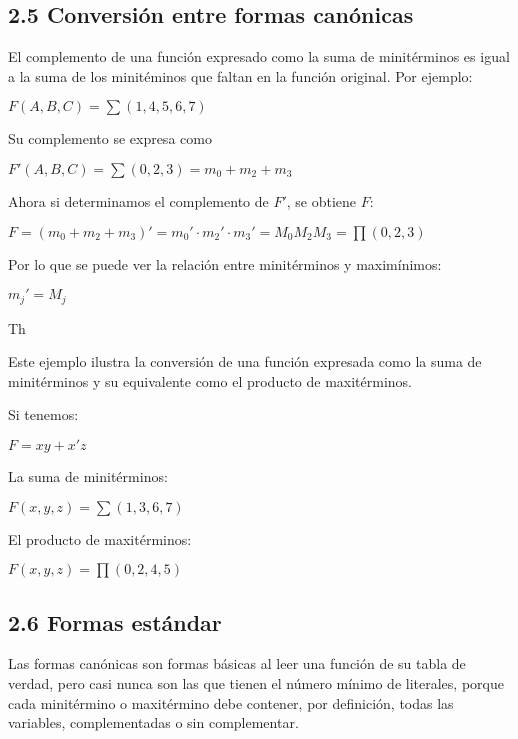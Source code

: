 \subsection*{2.5 Conversi\'{o}n entre formas can\'{o}nicas} El complemento de
una funci\'{o}n expresado como la suma de minit\'{e}rminos es igual a la suma de
los minit\'{e}minos que faltan en la funci\'{o}n original. Por ejemplo:

\begin{center} $F(A, B, C) = \sum(1, 4, 5, 6, 7)$ \end{center}
\begin{flushleft} Su complemento se expresa como \end{flushleft} \begin{center}
    $F'(A, B, C) = \sum(0, 2, 3) = m_0 + m_2 + m_3$ \end{center}

\begin{flushleft} Ahora si determinamos el complemento de $F'$, se obtiene $F$:
\end{flushleft} \begin{center} $F = (m_0 + m_2 + m_3)' = m_0' \cdot m_2' \cdot
        m_3' = M_0M_2M_3 = \prod(0, 2, 3)$ \end{center}

Por lo que se puede ver la relaci\'{o}n entre minit\'{e}rminos y
maxim\'{i}nimos: \begin{center} $m_j' = M_j$ \end{center} Th

Este ejemplo ilustra la conversi\'{o}n de una funci\'{o}n expresada como la
suma de minit\'{e}rminos y su equivalente como el producto de maxit\'{e}rminos.

Si tenemos: \begin{center} $F = xy + x'z$ \end{center}

\begin{flushleft} La suma de minit\'{e}rminos: \end{flushleft} \begin{center}
    $F(x, y, z) = \sum(1, 3, 6, 7)$ \end{center} \begin{flushleft} El producto de
    maxit\'{e}rminos: \end{flushleft} \begin{center} $F(x, y, z) = \prod(0, 2, 4,
        5)$ \end{center} \newpage

\subsection*{2.6 Formas est\'{a}ndar} Las formas can\'{o}nicas son formas
b\'{a}sicas al leer una funci\'{o}n de su tabla de verdad, pero casi nunca son
las que tienen el n\'{u}mero m\'{i}nimo de literales, porque cada
minit\'{e}rmino o maxit\'{e}rmino debe contener, por definici\'{o}n, todas las
variables, complementadas o sin complementar.

